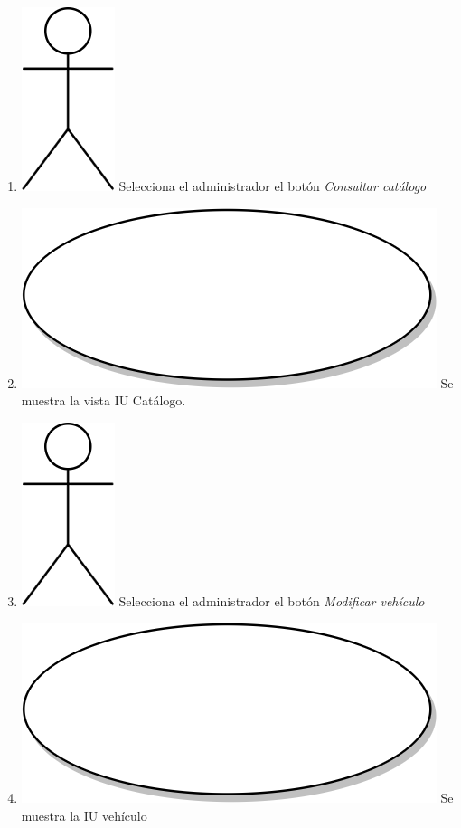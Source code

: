 \begin{enumerate}
  \item {\includegraphics[scale=.1]{Capitulo3/img/actor.png} Selecciona el administrador el botón \textit{Consultar catálogo}}
  \item {\includegraphics[scale=.05]{Capitulo3/img/proceso.png} Se muestra la vista IU Catálogo.}
  \item {\includegraphics[scale=.1]{Capitulo3/img/actor.png} Selecciona el administrador el botón \textit{Modificar vehículo}}
  \item {\includegraphics[scale=.05]{Capitulo3/img/proceso.png} Se muestra la IU vehículo
}
\end{enumerate}
